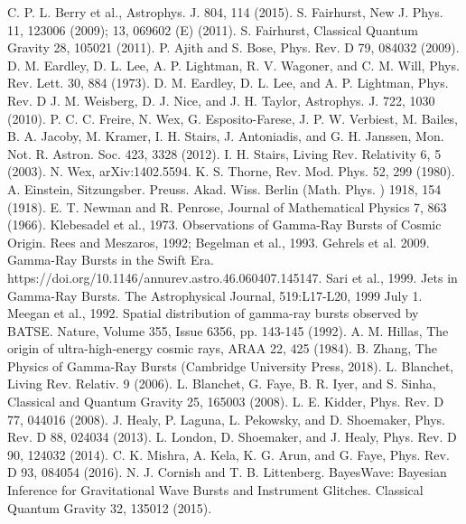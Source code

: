 \documentclass[binding=0.6cm, LaM]{sapthesis}
\begin{document}
\begin{thebibliography}{500}
	 C. P. L. Berry et al., Astrophys. J. 804, 114 (2015). 
	 S. Fairhurst, New J. Phys. 11, 123006 (2009); 13, 069602 (E) (2011). 
 	 S. Fairhurst, Classical Quantum Gravity 28, 105021 (2011). 
 	 P. Ajith and S. Bose, Phys. Rev. D 79, 084032 (2009). 
 	 D. M. Eardley, D. L. Lee, A. P. Lightman, R. V. Wagoner, and C. M. Will, Phys. Rev. Lett. 30, 884 (1973). 
 	 D. M. Eardley, D. L. Lee, and A. P. Lightman, Phys. Rev. D 
 	 J. M. Weisberg, D. J. Nice, and J. H. Taylor, Astrophys. J. 722, 1030 (2010).
 	 P. C. C. Freire, N. Wex, G. Esposito-Farese, J. P. W. Verbiest, M. Bailes, B. A. Jacoby, M. Kramer, I. H. Stairs, J. Antoniadis, and G. H. Janssen, Mon. Not. R. Astron. Soc. 423, 3328 (2012).
 	 I. H. Stairs, Living Rev. Relativity 6, 5 (2003).
 	 N. Wex, arXiv:1402.5594.
	 K. S. Thorne, Rev. Mod. Phys. 52, 299 (1980).
         A. Einstein, Sitzungsber. Preuss. Akad. Wiss. Berlin (Math. Phys. ) 1918, 154 (1918).
         E. T. Newman and R. Penrose, Journal of Mathematical Physics 7, 863 (1966).
	 Klebesadel et al., 1973. Observations of Gamma-Ray Bursts of Cosmic Origin.
	 Rees and Meszaros, 1992; Begelman et al., 1993.
	 Gehrels et al. 2009. Gamma-Ray Bursts in the Swift Era. https://doi.org/10.1146/annurev.astro.46.060407.145147.
	 Sari et al., 1999. Jets in Gamma-Ray Bursts. The Astrophysical Journal, 519:L17-L20, 1999 July 1.
	 Meegan et al., 1992. Spatial distribution of gamma-ray bursts observed by BATSE. Nature, Volume 355, Issue 6356, pp. 143-145 (1992).
	 A. M. Hillas, The origin of ultra-high-energy cosmic rays, ARAA 22, 425 (1984).
	 B. Zhang, The Physics of Gamma-Ray Bursts (Cambridge University Press, 2018).
	 L. Blanchet, Living Rev. Relativ. 9 (2006). 
	 L. Blanchet, G. Faye, B. R. Iyer, and S. Sinha, Classical and Quantum Gravity 25, 165003 (2008). 
	 L. E. Kidder, Phys. Rev. D 77, 044016 (2008). 
	 J. Healy, P. Laguna, L. Pekowsky, and D. Shoemaker, Phys. Rev. D 88, 024034 (2013). 
	 L. London, D. Shoemaker, and J. Healy, Phys. Rev. D 90, 124032 (2014). 
	 C. K. Mishra, A. Kela, K. G. Arun, and G. Faye, Phys. Rev. D 93, 084054 (2016).
	 N. J. Cornish and T. B. Littenberg. BayesWave: Bayesian Inference for Gravitational Wave Bursts and Instrument Glitches. Classical Quantum Gravity 32, 135012 (2015). 

\end{thebibliography}
\end{document}
